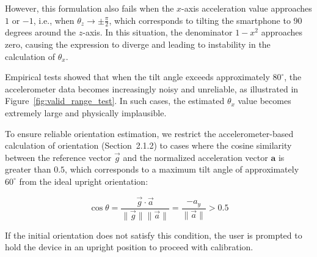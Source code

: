 \documentclass{article}
\begin{document}
However, this formulation also fails when the $x$-axis acceleration value approaches $1$ or $-1$, i.e., when $\theta_z \rightarrow \pm \frac{\pi}{2}$, which corresponds to tilting the smartphone to 90 degrees around the $z$-axis. In this situation, the denominator $1 - x^2$ approaches zero, causing the expression to diverge and leading to instability in the calculation of $\theta_x$.

Empirical tests showed that when the tilt angle exceeds approximately $80^\circ$, the accelerometer data becomes increasingly noisy and unreliable, as illustrated in Figure~\ref{fig:valid_range_test}. In such cases, the estimated $\theta_x$ value becomes extremely large and physically implausible.

To ensure reliable orientation estimation, we restrict the accelerometer-based calculation of orientation (Section~2.1.2) to cases where the cosine similarity between the reference vector $\vec{g}$ and the normalized acceleration vector $\mathbf{a}$ is greater than $0.5$, which corresponds to a maximum tilt angle of approximately $60^\circ$ from the ideal upright orientation:

\[
\cos\theta = \frac{ \vec{g} \cdot \vec{a}}{\| \vec{g}\| \|\vec{a}\|} = \frac{-a_y}{\|\vec{a}\|} > 0.5
\]

If the initial orientation does not satisfy this condition, the user is prompted to hold the device in an upright position to proceed with calibration.
\end{document}
